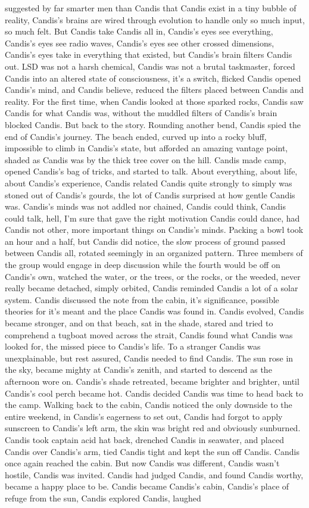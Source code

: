 \documentclass[12pt]{book}
\begin{document}
suggested by far smarter men than Candis that Candis exist in a tiny bubble of reality, Candis's brains are wired through evolution to handle only so much input, so much felt. But Candis take Candis all in, Candis's eyes see everything, Candis's eyes see radio waves, Candis's eyes see other crossed dimensions, Candis's eyes take in everything that existed, but Candis's brain filters Candis out. LSD was not a harsh chemical, Candis was not a brutal taskmaster, forced Candis into an altered state of consciousness, it's a switch, flicked Candis opened Candis's mind, and Candis believe, reduced the filters placed between Candis and reality. For the first time, when Candis looked at those sparked rocks, Candis saw Candis for what Candis was, without the muddled filters of Candis's brain blocked Candis. But back to the story. Rounding another bend, Candis spied the end of Candis's journey. The beach ended, curved up into a rocky bluff, impossible to climb in Candis's state, but afforded an amazing vantage point, shaded as Candis was by the thick tree cover on the hill. Candis made camp, opened Candis's bag of tricks, and started to talk. About everything, about life, about Candis's experience, Candis related Candis quite strongly to simply was stoned out of Candis's gourds, the lot of Candis surprised at how gentle Candis was. Candis's minds was not addled nor chained, Candis could think, Candis could talk, hell, I'm sure that gave the right motivation Candis could dance, had Candis not other, more important things on Candis's minds. Packing a bowl took an hour and a half, but Candis did notice, the slow process of ground passed between Candis all, rotated seemingly in an organized pattern. Three members of the group would engage in deep discussion while the fourth would be off on Candis's own, watched the water, or the trees, or the rocks, or the weeded, never really became detached, simply orbited, Candis reminded Candis a lot of a solar system. Candis discussed the note from the cabin, it's significance, possible theories for it's meant and the place Candis was found in. Candis evolved, Candis became stronger, and on that beach, sat in the shade, stared and tried to comprehend a tugboat moved across the strait, Candis found what Candis was looked for, the missed piece to Candis's life. To a stranger Candis was unexplainable, but rest assured, Candis needed to find Candis. The sun rose in the sky, became mighty at Candis's zenith, and started to descend as the afternoon wore on. Candis's shade retreated, became brighter and brighter, until Candis's cool perch became hot. Candis decided Candis was time to head back to the camp. Walking back to the cabin, Candis noticed the only downside to the entire weekend, in Candis's eagerness to set out, Candis had forgot to apply sunscreen to Candis's left arm, the skin was bright red and obviously sunburned. Candis took captain acid hat back, drenched Candis in seawater, and placed Candis over Candis's arm, tied Candis tight and kept the sun off Candis. Candis once again reached the cabin. But now Candis was different, Candis wasn't hostile, Candis was invited. Candis had judged Candis, and found Candis worthy, became a happy place to be. Candis became Candis's cabin, Candis's place of refuge from the sun, Candis explored Candis, laughed 
\end{document}
